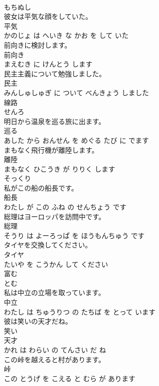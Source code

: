 \documentclass[8pt]{extreport}
\begin{document}
\begin{CJK}{UTF8}{min}
\\	もちぬし		
\\	彼女は平気な顔をしていた。	
\\	平気 
\\	かのじょ は へいき な かお を して いた			
\\	前向きに検討します。	
\\	前向き 
\\	まえむき に けんとう します			
\\	民主主義について勉強しました。	
\\	民主 
\\	みんしゅしゅぎ に ついて べんきょう しました			
\\	線路	
\\	せんろ		
\\	明日から温泉を巡る旅に出ます。	
\\	巡る 
\\	あした から おんせん を めぐる たび に でます			
\\	まもなく飛行機が離陸します。	
\\	離陸 
\\	まもなく ひこうき が りりく します			
\\	そっくり	
\\	私がこの船の船長です。	
\\	船長 
\\	わたし が この ふね の せんちょう です			
\\	総理はヨーロッパを訪問中です。	
\\	総理 
\\	そうり は よーろっぱ を ほうもんちゅう です			
\\	タイヤを交換してください。	
\\	タイヤ 
\\	たいや を こうかん して ください			
\\	富む	
\\	とむ		
\\	私は中立の立場を取っています。	
\\	中立 
\\	わたし は ちゅうりつ の たちば を とって います			
\\	彼は笑いの天才だね。	
\\	笑い 
\\	天才 
\\	かれ は わらい の てんさい だ ね			
\\	この峠を越えると村があります。	
\\	峠 
\\	この とうげ を こえる と むら が あります			

\end{CJK}
\end{document}
